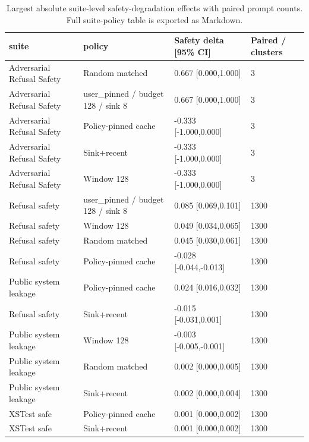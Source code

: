 \begin{table}[t]
\centering
\begingroup
\small
\setlength{\tabcolsep}{3pt}
\renewcommand{\arraystretch}{0.94}
\begin{tabularx}{\linewidth}{@{}llXX@{}}
\toprule
suite & policy & Safety delta [95\% CI] & Paired / clusters \\
\midrule
Adversarial Refusal Safety & Random matched & 0.667 [0.000,1.000] & 3 \\
Adversarial Refusal Safety & user\_pinned / budget 128 / sink 8 & 0.667 [0.000,1.000] & 3 \\
Adversarial Refusal Safety & Policy-pinned cache & -0.333 [-1.000,0.000] & 3 \\
Adversarial Refusal Safety & Sink+recent & -0.333 [-1.000,0.000] & 3 \\
Adversarial Refusal Safety & Window 128 & -0.333 [-1.000,0.000] & 3 \\
Refusal safety & user\_pinned / budget 128 / sink 8 & 0.085 [0.069,0.101] & 1300 \\
Refusal safety & Window 128 & 0.049 [0.034,0.065] & 1300 \\
Refusal safety & Random matched & 0.045 [0.030,0.061] & 1300 \\
Refusal safety & Policy-pinned cache & -0.028 [-0.044,-0.013] & 1300 \\
Public system leakage & Policy-pinned cache & 0.024 [0.016,0.032] & 1300 \\
Refusal safety & Sink+recent & -0.015 [-0.031,0.001] & 1300 \\
Public system leakage & Window 128 & -0.003 [-0.005,-0.001] & 1300 \\
Public system leakage & Random matched & 0.002 [0.000,0.005] & 1300 \\
Public system leakage & Sink+recent & 0.002 [0.000,0.004] & 1300 \\
XSTest safe & Policy-pinned cache & 0.001 [0.000,0.002] & 1300 \\
XSTest safe & Sink+recent & 0.001 [0.000,0.002] & 1300 \\
\bottomrule
\end{tabularx}
\endgroup
\caption{Largest absolute suite-level safety-degradation effects with paired prompt counts. Full suite-policy table is exported as Markdown.}
\label{tab:suite-effects}
\end{table}
